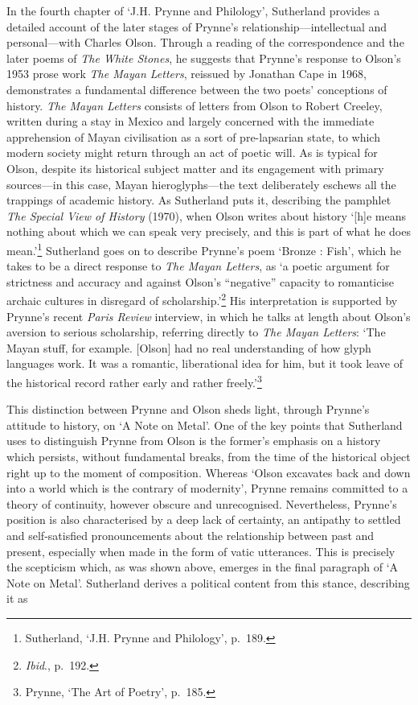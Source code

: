 \documentclass[]{article}
\begin{document}
In the fourth chapter of ‘J.H. Prynne and Philology’, Sutherland
provides a detailed account of the later stages of Prynne’s
relationship—intellectual and personal—with Charles Olson. Through a
reading of the correspondence and the later poems of \emph{The White
Stones}, he suggests that Prynne’s response to Olson’s 1953 prose work
\emph{The Mayan Letters}, reissued by Jonathan Cape in 1968,
demonstrates a fundamental difference between the two poets’ conceptions
of history. \emph{The Mayan Letters} consists of letters from Olson to
Robert Creeley, written during a stay in Mexico and largely concerned
with the immediate apprehension of Mayan civilisation as a sort of
pre-lapsarian state, to which modern society might return through an act
of poetic will. As is typical for Olson, despite its historical subject
matter and its engagement with primary sources—in this case, Mayan
hieroglyphs—the text deliberately eschews all the trappings of academic
history. As Sutherland puts it, describing the pamphlet \emph{The
Special View of History} (1970), when Olson writes about history
‘{[}h{]}e means nothing about which we can speak very precisely, and
this is part of what he does mean.’\footnote{Sutherland, ‘J.H. Prynne
  and Philology’, p.~189.} Sutherland goes on to describe Prynne’s poem
‘Bronze : Fish’, which he takes to be a direct response to \emph{The
Mayan Letters}, as ‘a poetic argument for strictness and accuracy and
against Olson’s “negative” capacity to romanticise archaic cultures in
disregard of scholarship.’\footnote{\emph{Ibid}., p.~192.} His
interpretation is supported by Prynne’s recent \emph{Paris Review}
interview, in which he talks at length about Olson’s aversion to serious
scholarship, referring directly to \emph{The Mayan Letters}: ‘The Mayan
stuff, for example. {[}Olson{]} had no real understanding of how glyph
languages work. It was a romantic, liberational idea for him, but it
took leave of the historical record rather early and rather
freely.’\footnote{Prynne, ‘The Art of Poetry’, p.~185.}

This distinction between Prynne and Olson sheds light, through Prynne’s
attitude to history, on ‘A Note on Metal’. One of the key points that
Sutherland uses to distinguish Prynne from Olson is the former’s
emphasis on a history which persists, without fundamental breaks, from
the time of the historical object right up to the moment of composition.
Whereas ‘Olson excavates back and down into a world which is the
contrary of modernity’, Prynne remains committed to a theory of
continuity, however obscure and unrecognised. Nevertheless, Prynne’s
position is also characterised by a deep lack of certainty, an antipathy
to settled and self-satisfied pronouncements about the relationship
between past and present, especially when made in the form of vatic
utterances. This is precisely the scepticism which, as was shown above,
emerges in the final paragraph of ‘A Note on Metal’. Sutherland derives
a political content from this stance, describing it as
\end{document}
